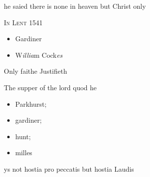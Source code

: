 \documentclass[12pt, a4paper]{book}
\begin{document}
	
				\marginpar[\vspace{0.5cm}{\textcolor{Gray}{Brandkirk Shether Joan Marden  Robert Colman}}]{}
			 
		\ifthenelse{\isodd{\thepage}}
		{\reversemarginpar}
		{\normalmarginpar}
		he saied there is none in heaven but Christ only



               
                  
				\begin{center}  {\scshape In Lent 1541
                  }  \end{center}
			
               	
               		
               			\begin{itemize}
               				\item[]Gardiner
               				\item[]W\textit{illia}m Cock\textit{es}
               			\end{itemize}
               			
			
               		
		\ifthenelse{\isodd{\thepage}}
		{\reversemarginpar}
		{\normalmarginpar}
		Only faithe Justifieth
               	
               	
               		
		\ifthenelse{\isodd{\thepage}}
		{\reversemarginpar}
		{\normalmarginpar}
		The supper of the lord quod he
               	
               	
               	
               		
               			\begin{itemize}
               				\item[]Parkhurst;
               				\item[]gardiner;
               				\item[]hunt;
               				\item[]milles
               			\end{itemize}
               			
			
               		
		\ifthenelse{\isodd{\thepage}}
		{\reversemarginpar}
		{\normalmarginpar}
		ys not hostia pro peccatis but hostia Laudis
               	
\end{document}
